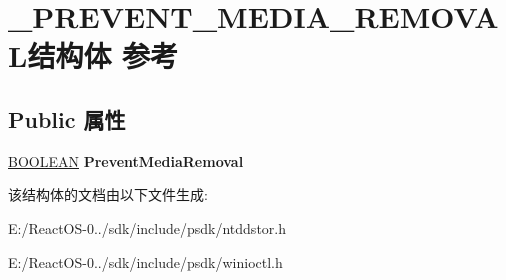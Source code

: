 \hypertarget{struct___p_r_e_v_e_n_t___m_e_d_i_a___r_e_m_o_v_a_l}{}\section{\+\_\+\+P\+R\+E\+V\+E\+N\+T\+\_\+\+M\+E\+D\+I\+A\+\_\+\+R\+E\+M\+O\+V\+A\+L结构体 参考}
\label{struct___p_r_e_v_e_n_t___m_e_d_i_a___r_e_m_o_v_a_l}
\subsection*{Public 属性}
\begin{DoxyCompactItemize}
\item 
\mbox{\label{struct___p_r_e_v_e_n_t___m_e_d_i_a___r_e_m_o_v_a_l_a6161b45a445608bb614b1f26094e789b}} 
\hyperlink{_processor_bind_8h_a112e3146cb38b6ee95e64d85842e380a}{B\+O\+O\+L\+E\+AN} {\bfseries Prevent\+Media\+Removal}
\end{DoxyCompactItemize}


该结构体的文档由以下文件生成\+:\begin{DoxyCompactItemize}
\item 
E\+:/\+React\+O\+S-\/0../sdk/include/psdk/ntddstor.\+h\item 
E\+:/\+React\+O\+S-\/0../sdk/include/psdk/winioctl.\+h\end{DoxyCompactItemize}
